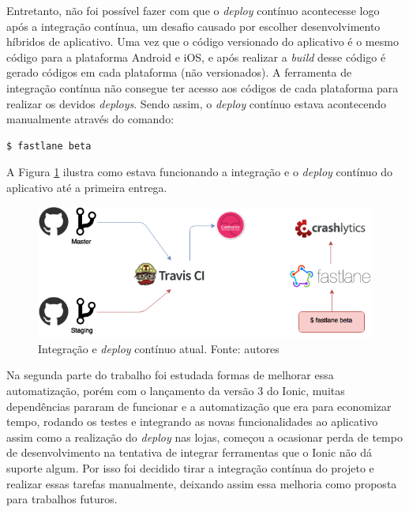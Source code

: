 Entretanto, não foi possível fazer com que o \textit{deploy} contínuo acontecesse logo após a integração contínua, um desafio causado por escolher desenvolvimento híbridos de aplicativo. Uma vez que o código versionado do aplicativo é o mesmo código para a plataforma Android e iOS, e após realizar a \textit{build} desse código é gerado códigos em cada plataforma (não versionados). A ferramenta de integração contínua não consegue ter acesso aos códigos de cada plataforma para realizar os devidos \textit{deploys}. Sendo assim, o \textit{deploy} contínuo estava acontecendo manualmente através do comando:

\begin{lstlisting}[language=bash]
  $ fastlane beta
\end{lstlisting}

A Figura \ref{img:integracao_deploy_continuo_atual} ilustra como estava funcionando a integração e o \textit{deploy} contínuo do aplicativo até a primeira entrega.

\begin{figure}[H]
    \centering
    \includegraphics[scale=0.5]{figuras/ci_currently.png}
    \caption[Integração e \textit{deploy} contínuo atual]{Integração e \textit{deploy} contínuo atual. Fonte: autores}
    \label{img:integracao_deploy_continuo_atual}
\end{figure}

Na segunda parte do trabalho foi estudada formas de melhorar essa automatização, porém com o lançamento da versão 3 do Ionic, muitas dependências pararam de funcionar e a automatização que era para economizar tempo, rodando os testes e integrando as novas funcionalidades ao aplicativo assim como a realização do \textit{deploy} nas lojas, começou a ocasionar perda de tempo de desenvolvimento na tentativa de integrar ferramentas que o Ionic não dá suporte algum. Por isso foi decidido tirar a integração contínua do projeto e realizar essas tarefas manualmente, deixando assim essa melhoria como proposta para trabalhos futuros.
